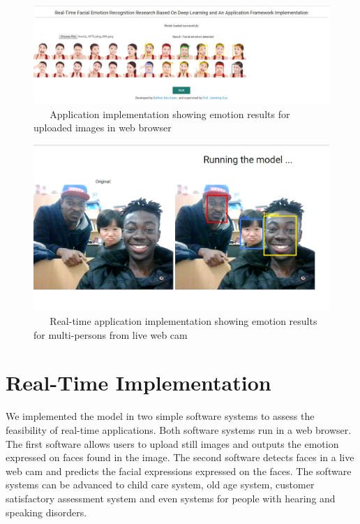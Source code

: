 \documentclass[master]{thesis-uestc}
\begin{document}
\begin{figure}[ht]
\includegraphics[width=6in]{pic/rt-1.JPG}
\caption{\,\,\,\,\,\,\,\,\,\,Application implementation showing emotion results for uploaded images in web browser}
\label{rt_uploaded}
\end{figure}

\begin{figure}[ht]
\includegraphics[width=6in]{pic/rt-2.png}
\caption{\,\,\,\,\,\,\,\,\,\,Real-time application implementation showing emotion results for multi-persons from live web cam}
\label{rt_livecam}
\end{figure}

\section{Real-Time Implementation}
We implemented the model in two simple software systems to assess the feasibility of real-time applications. Both software systems run in a web browser. The first software allows users to upload still images and outputs the emotion expressed on faces found in the image. The second software detects faces in a live web cam and predicts the facial expressions expressed on the faces. The software systems can be advanced to child care system, old age system, customer satisfactory assessment system and even systems for people with hearing and speaking disorders.
\end{document}
